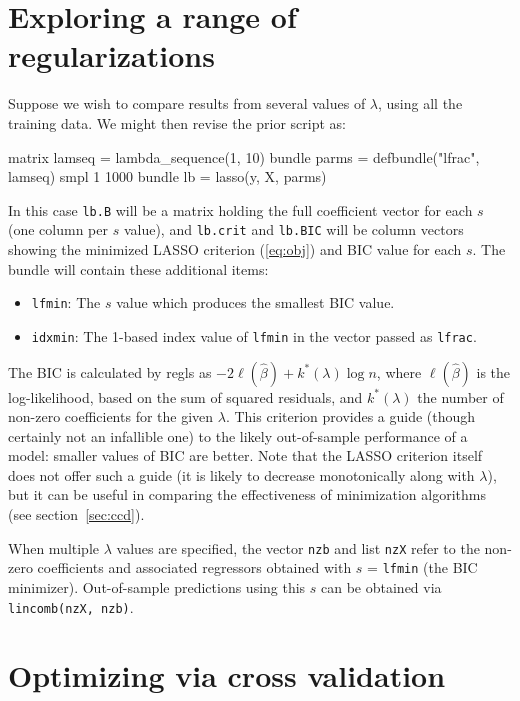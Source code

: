 \documentclass{article}
\begin{document}
\section{Exploring a range of regularizations}
\label{sec:simple-search}

Suppose we wish to compare results from several values of $\lambda$,
using all the training data. We might then revise the prior script as:
\begin{code}
matrix lamseq = lambda_sequence(1, 10)
bundle parms = defbundle("lfrac", lamseq)
smpl 1 1000
bundle lb = lasso(y, X, parms)
\end{code}

In this case \texttt{lb.B} will be a matrix holding the full
coefficient vector for each $s$ (one column per $s$ value), and
\texttt{lb.crit} and \texttt{lb.BIC} will be column vectors showing
the minimized LASSO criterion (\ref{eq:obj}) and BIC value for each
$s$. The bundle will contain these additional items:
\begin{itemize}
\item \texttt{lfmin}: The $s$ value which produces the smallest BIC
  value.
\item \texttt{idxmin}: The 1-based index value of \texttt{lfmin} in
  the vector passed as \texttt{lfrac}.
\end{itemize}

The BIC \citep{schwarz78} is calculated by \textsf{regls} as
$-2\ell(\hat{\beta}) + k^*(\lambda) \log n$, where $\ell(\hat{\beta})$
is the log-likelihood, based on the sum of squared residuals, and
$k^*(\lambda)$ the number of non-zero coefficients for the given
$\lambda$. This criterion provides a guide (though certainly not an
infallible one) to the likely out-of-sample performance of a model:
smaller values of BIC are better. Note that the LASSO criterion itself
does not offer such a guide (it is likely to decrease monotonically
along with $\lambda$), but it can be useful in comparing the
effectiveness of minimization algorithms (see section~\ref{sec:ccd}).

When multiple $\lambda$ values are specified, the vector \texttt{nzb}
and list \texttt{nzX} refer to the non-zero coefficients and
associated regressors obtained with $s$ = \texttt{lfmin} (the BIC
minimizer). Out-of-sample predictions using this $s$ can be obtained
via \texttt{lincomb(nzX, nzb)}.

\section{Optimizing via cross validation}
\label{sec:xvalid}
\end{document}
